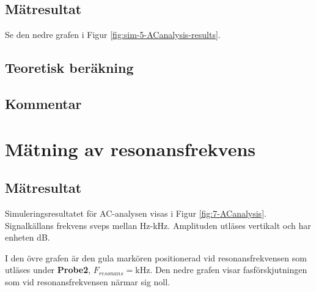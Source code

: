 \documentclass[11pt,a4paper]{article}
\begin{document}
\subsection{Mätresultat}\label{}
Se den nedre grafen i Figur \ref{fig:sim-5-ACanalysis-results}.

\subsection{Teoretisk beräkning}\label{}

\subsection{Kommentar}\label{}

\clearpage

\section{Mätning av resonansfrekvens}\label{}

\subsection{Mätresultat}\label{}
Simuleringsresultatet för AC-analysen visas i Figur \ref{fig:7-ACanalysis}.
Signalkällans frekvens sveps mellan \unit[100]{\si{\Hz}}-\unit[100]{\si{\kHz}}.
Amplituden utläses vertikalt och har enheten \si{\dB}.
\par I den övre grafen är den gula markören positionerad vid resonansfrekvensen 
som utläses under \textbf{Probe2}, $F_{resonans} = $\unit[15,8489]{\si{\kHz}}.
Den nedre grafen visar fasförskjutningen som vid resonansfrekvensen närmar sig noll.
\end{document}
